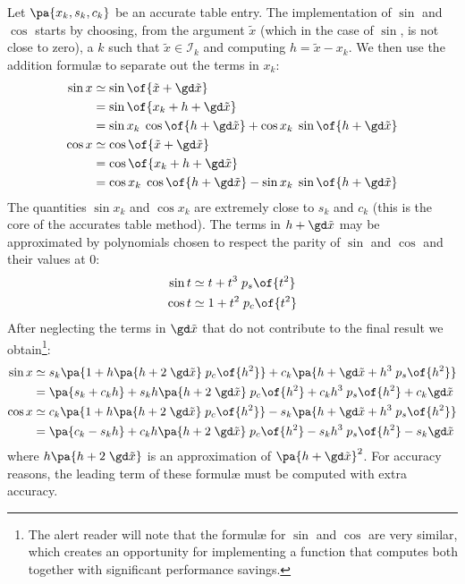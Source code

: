 \documentclass[10pt, a4paper, twoside]{basestyle}
\newcommand{\red}[1]{\tilde{#1}}
\begin{document}
Let $\pa{x_k, s_k, c_k}$ be an accurate table entry.  The implementation of $\sin$ and $\cos$ starts by choosing, from the argument $\red x$ (which in the case of $\sin$, is not close to zero), a $k$ such that $\red x \in \mathscr{I}_k$ and computing $h = \red x - x_k$.  We then use the addition formulæ to separate out the terms in $x_k$:
\begin{align*}
\sin x &\simeq \sin\of{\red x + \gd \red x} \\
&= \sin\of{x_k + h + \gd \red x} \\
&= \sin x_k \; \cos\of{h + \gd \red x} + \cos x_k \; \sin\of{h + \gd \red x} \\
\cos x &\simeq \cos\of{\red x + \gd \red x}  \\
&= \cos\of{x_k + h + \gd \red x} \\
&= \cos x_k \; \cos\of{h + \gd \red x} - \sin x_k \; \sin\of{h + \gd \red x}
\end{align*}
The quantities $\sin x_k$ and $\cos x_k$ are extremely close to $s_k$ and $c_k$ (this is the core of the accurates table method).  The terms in $h + \gd \red x$ may be approximated by polynomials chosen to respect the parity of $\sin$ and $\cos$ and their values at $0$:
\begin{align*}
\sin t &\simeq t + t^3 \; p_s\of{t^2} \\
\cos t &\simeq 1 + t^2 \; p_c\of{t^2}
\end{align*}
After neglecting the terms in $\gd \red x$ that do not contribute to the final result we obtain\footnote{The alert reader will note that the formulæ for $\sin$ and $\cos$ are very similar, which creates an opportunity for implementing a function that computes both together with significant performance savings.}:
\begin{align*}
\sin x &\simeq s_k \pa{1 + h \pa{h + 2 \; \gd \red x} \; p_c\of{h^2}} + c_k \pa{h + \gd \red x + h^3 \; p_s\of{h^2}} \\
&= \pa{s_k + c_k h} + s_k h \pa{h + 2 \; \gd \red x} \; p_c\of{h^2} + c_k h^3 \; p_s\of{h^2} + c_k \gd \red x \\
\cos x &\simeq c_k \pa{1 + h \pa{h + 2 \; \gd \red x} \; p_c\of{h^2}} - s_k \pa{h + \gd \red x + h^3 \; p_s\of{h^2}} \\
&= \pa{c_k - s_k h} + c_k h \pa{h + 2 \; \gd \red x} \; p_c\of{h^2} - s_k h^3 \; p_s\of{h^2} - s_k \gd \red x
\end{align*}
where $h \pa{h + 2 \; \gd \red x}$ is an approximation of $\pa{h + \gd \red x}^2$.  For accuracy reasons, the leading term of these formulæ must be computed with extra accuracy.
\end{document}
